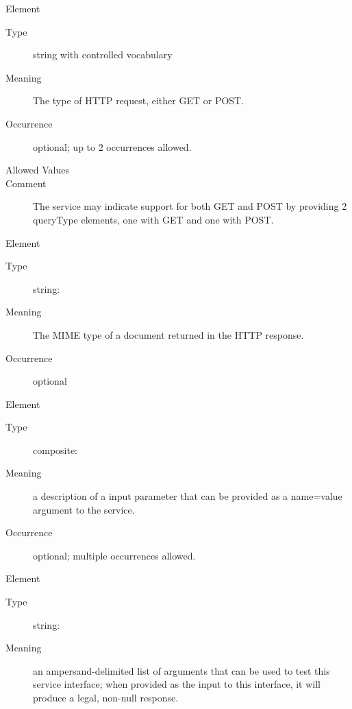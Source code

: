 \documentclass[11pt,a4paper]{ivoa}
\begin{document}
\begin{generated}
\begingroup\small\begin{bigdescription}\item[Element \xmlel{queryType}]
\begin{description}
\item[Type] string with controlled vocabulary
\item[Meaning] 
                       The type of HTTP request, either GET or POST.
                     
\item[Occurrence] optional; up to 2 occurrences allowed.

\item[Allowed Values]\hfil
\begin{longtermsdescription}
\item[GET]
\item[POST]
\end{longtermsdescription}
\item[Comment] 
                       The service may indicate support for both GET
                       and POST by providing 2 queryType elements, one
                       with GET and one with POST.
                     

\end{description}
\item[Element \xmlel{resultType}]
\begin{description}
\item[Type] string: 
\item[Meaning] 
                       The MIME type of a document returned in the HTTP response.
                     
\item[Occurrence] optional

\end{description}
\item[Element \xmlel{param}]
\begin{description}
\item[Type] composite: 
\item[Meaning] 
                       a description of a input parameter that can be 
                       provided as a name=value argument to the service.  
                    
\item[Occurrence] optional; multiple occurrences allowed.

\end{description}
\item[Element \xmlel{testQuery}]
\begin{description}
\item[Type] string: 
\item[Meaning] 
                       an ampersand-delimited list of arguments that
                       can be used to test this service interface; 
                       when provided as the input to this interface,
                       it will produce a legal, non-null response.
                    

\end{description}
\end{bigdescription}
\end{generated}
\end{document}
